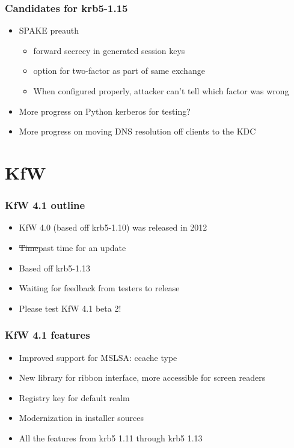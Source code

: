 \documentclass{beamer}
\begin{document}
\begin{frame}
\frametitle{Candidates for krb5-1.15}
\begin{itemize}
\item{SPAKE preauth}
	\begin{itemize}
	\item{forward secrecy in generated session keys}
	\item{option for two-factor as part of same exchange}
	\item{When configured properly, attacker can't tell which factor was
		wrong}
	\end{itemize}
\item{More progress on Python kerberos for testing?}
\item{More progress on moving DNS resolution off clients to the KDC}
\end{itemize}
\end{frame}

\section{KfW}

\begin{frame}
\frametitle{KfW 4.1 outline}
\begin{itemize}
\item{KfW 4.0 (based off krb5-1.10) was released in 2012}
\item{\sout{Time}past time for an update}
\item{Based off krb5-1.13}
\item{Waiting for feedback from testers to release}
\item{Please test KfW 4.1 beta 2!}
\end{itemize}
\end{frame}

\begin{frame}
\frametitle{KfW 4.1 features}
\begin{itemize}
\item{Improved support for MSLSA: ccache type}
\item{New library for ribbon interface, more accessible for screen readers}
\item{Registry key for default realm}
\item{Modernization in installer sources}
\item{All the features from krb5 1.11 through krb5 1.13}
\end{itemize}
\end{frame}
\end{document}
